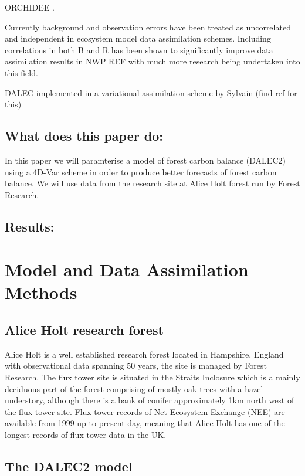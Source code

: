 \documentclass[11pt]{article}
\begin{document}
ORCHIDEE \citep{Verbeeck2011}.

Currently background and observation errors have been treated as uncorrelated and independent in ecosystem model data assimilation schemes. Including correlations in both B and R has been shown to significantly improve data assimilation results in NWP REF with much more research being undertaken into this field.   

DALEC implemented in a variational assimilation scheme by Sylvain (find ref for this) 

\subsection{What does this paper do:}
In this paper we will paramterise a model of forest carbon balance (DALEC2) using a 4D-Var scheme in order to produce better forecasts of forest carbon balance. We will use data from the research site at Alice Holt forest run by Forest Research.

\subsection{Results:}  



\section{Model and Data Assimilation Methods}

\subsection{Alice Holt research forest}

Alice Holt is a well established research forest located in Hampshire, England with observational data spanning 50 years, the site is managed by Forest Research. The flux tower site is situated in the Straits Inclosure which is a mainly deciduous part of the forest comprising of mostly oak trees with a hazel understory, although there is a bank of conifer approximately 1km north west of the flux tower site. Flux tower records of Net Ecosystem Exchange (NEE) are available from 1999 up to present day, meaning that Alice Holt has one of the longest records of flux tower data in the UK.  

\subsection{The DALEC2 model}
\end{document}
